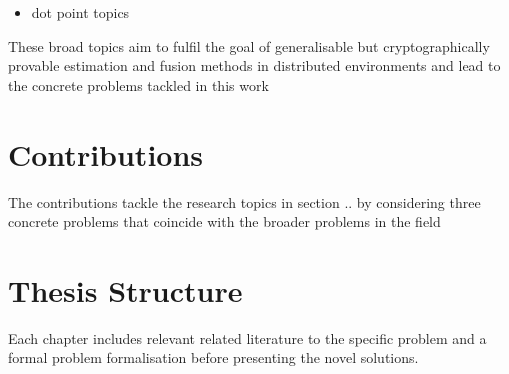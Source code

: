 \begin{itemize}
    \item dot point topics
\end{itemize}

These broad topics aim to fulfil the goal of generalisable but cryptographically provable estimation and fusion methods in distributed environments and lead to the concrete problems tackled in this work

% 
%                                                
%                                                
%                                                
% 
\section{Contributions}

The contributions tackle the research topics in section .. by considering three concrete problems that coincide with the broader problems in the field



% 
%                                                                    
%                                                                    
%                                                                    
% 
\section{Thesis Structure}

Each chapter includes relevant related literature to the specific problem and a formal problem formalisation before presenting the novel solutions.
